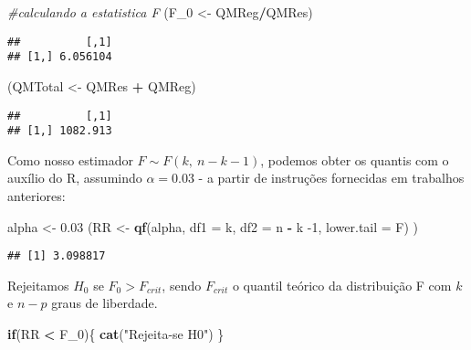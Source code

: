 \documentclass[
]{article}
\newenvironment{Shaded}{\begin{snugshade}}{\end{snugshade}}
\newcommand{\CommentTok}[1]{\textcolor[rgb]{0.56,0.35,0.01}{\textit{#1}}}
\newcommand{\ControlFlowTok}[1]{\textcolor[rgb]{0.13,0.29,0.53}{\textbf{#1}}}
\newcommand{\DataTypeTok}[1]{\textcolor[rgb]{0.13,0.29,0.53}{#1}}
\newcommand{\DecValTok}[1]{\textcolor[rgb]{0.00,0.00,0.81}{#1}}
\newcommand{\FloatTok}[1]{\textcolor[rgb]{0.00,0.00,0.81}{#1}}
\newcommand{\KeywordTok}[1]{\textcolor[rgb]{0.13,0.29,0.53}{\textbf{#1}}}
\newcommand{\NormalTok}[1]{#1}
\newcommand{\OperatorTok}[1]{\textcolor[rgb]{0.81,0.36,0.00}{\textbf{#1}}}
\newcommand{\StringTok}[1]{\textcolor[rgb]{0.31,0.60,0.02}{#1}}
\begin{document}
\begin{Shaded}
\begin{Highlighting}[]
\CommentTok{#calculando a estatistica F}
\NormalTok{(F_}\DecValTok{0}\NormalTok{ <-}\StringTok{ }\NormalTok{QMReg}\OperatorTok{/}\NormalTok{QMRes)}
\end{Highlighting}
\end{Shaded}

\begin{verbatim}
##          [,1]
## [1,] 6.056104
\end{verbatim}

\begin{Shaded}
\begin{Highlighting}[]
\NormalTok{(QMTotal <-}\StringTok{ }\NormalTok{QMRes }\OperatorTok{+}\StringTok{ }\NormalTok{QMReg)}
\end{Highlighting}
\end{Shaded}

\begin{verbatim}
##          [,1]
## [1,] 1082.913
\end{verbatim}

Como nosso estimador \(F \sim F(k,\ n - k - 1)\), podemos obter os
quantis com o auxílio do R, assumindo \(\alpha = 0.03\) - a partir de
instruções fornecidas em trabalhos anteriores:

\begin{Shaded}
\begin{Highlighting}[]
\NormalTok{alpha <-}\StringTok{ }\FloatTok{0.03}
\NormalTok{(RR <-}\StringTok{ }\KeywordTok{qf}\NormalTok{(alpha, }\DataTypeTok{df1 =}\NormalTok{ k, }\DataTypeTok{df2 =}\NormalTok{ n }\OperatorTok{-}\StringTok{ }\NormalTok{k }\DecValTok{-1}\NormalTok{, }\DataTypeTok{lower.tail =}\NormalTok{ F) )}
\end{Highlighting}
\end{Shaded}

\begin{verbatim}
## [1] 3.098817
\end{verbatim}

Rejeitamos \(H_0\) se \(F_0 > F_{crit}\), sendo \(F_{crit}\) o quantil
teórico da distribuição F com \(k\) e \(n-p\) graus de liberdade.

\begin{Shaded}
\begin{Highlighting}[]
\ControlFlowTok{if}\NormalTok{(RR }\OperatorTok{<}\StringTok{ }\NormalTok{F_}\DecValTok{0}\NormalTok{)\{}
  \KeywordTok{cat}\NormalTok{(}\StringTok{"Rejeita-se H0"}\NormalTok{)}
\NormalTok{\}}
\end{Highlighting}
\end{Shaded}
\end{document}
